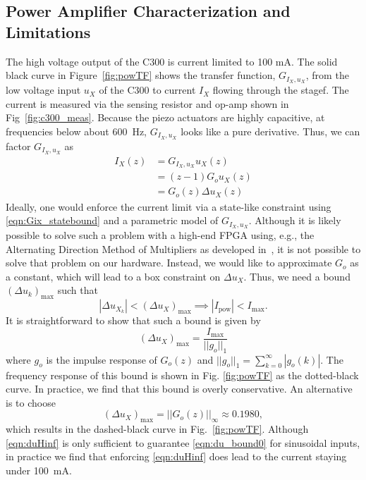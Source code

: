 \documentclass[twocolumn,twoside]{IEEEtran}
\begin{document}
\subsection{Power Amplifier Characterization and Limitations}\label{sec:powcharct}
The high voltage output of the C300 is current limited to 100 mA. The solid black curve in Figure~\ref{fig:powTF} shows the transfer function, $G_{I_X,u_X}$, from the low voltage input $u_X$ of the C300 to current $I_X$ flowing through the stagef. The current is measured via the sensing resistor and op-amp shown in Fig~\ref{fig:c300_meas}. Because the piezo actuators are highly capacitive, at frequencies below about 600~Hz, $G_{I_X,u_X}$ looks like a pure derivative.
Thus, we can factor $G_{I_X,u_X}$ as
\begin{align}
  I_{X}(z) &= G_{I_X,u_X} u_X(z)\label{eqn:Gix_statebound}\\
          & = (z-1) G_o u_X(z)\nonumber\\
          & = G_o(z) \Delta u_X(z) \label{eqn:Gostatebound}
\end{align}
Ideally, one would enforce the current limit via a state-like constraint using \eqref{eqn:Gix_statebound} and a parametric model of $G_{I_X,u_X}$.
Although it is likely possible to solve such a problem with a high-end FPGA using, e.g., the Alternating Direction Method of Multipliers as developed in~\cite{Jerez_Trans_2014}, it is not possible to solve that problem on our hardware. Instead, we would like to approximate $G_o$ as a constant, which will lead to a box constraint on $\Delta u_X$. Thus, we need a bound $(\Delta u_k)_{\text{max}}$ such that
\begin{equation}
  |\Delta u_{X_k}| < (\Delta u_X)_{\text{max}} \implies |I_{\text{pow}}| < I_{\text{max}}.\label{eqn:du_bound0}
\end{equation}
It is straightforward to show that such a bound is given by 
\begin{equation}
(\Delta u_X)_{\text{max}} = \frac{I_{\text{max}}}{||g_o||_1}\label{eqn:h1bound}
\end{equation}
where $g_o$ is the impulse response of $G_o(z)$ and ${||g_o||_1 = \sum_{k=0}^{\infty}|g_o(k)|}$. The frequency response of this bound is shown in Fig. \ref{fig:powTF} as the dotted-black curve. In practice, we find that this bound is overly conservative. An alternative is to choose
\begin{equation}
(\Delta u_X)_{\text{max}} = ||G_o(z)||_{\infty}\approx 0.1980, \label{eqn:duHinf}
\end{equation}
which results in the dashed-black curve in Fig.~\ref{fig:powTF}. Although \eqref{eqn:duHinf} is only sufficient to guarantee \eqref{eqn:du_bound0} for sinusoidal inputs, in practice we find that enforcing \eqref{eqn:duHinf} does lead to the current staying under 100~mA.
\end{document}
